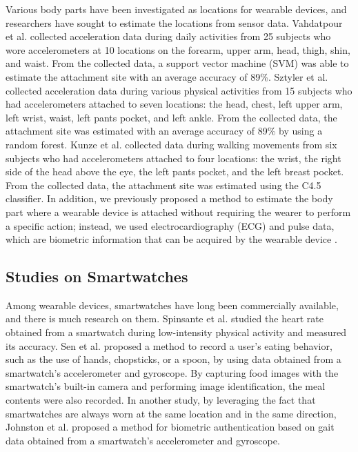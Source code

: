 \documentclass[sigchi,authordraft]{acmart}
\begin{document}
Various body parts have been investigated as locations for wearable devices, and researchers have sought to estimate the locations from sensor data. Vahdatpour et al. \cite{localization_vahdatpour} collected acceleration data during daily activities from 25 subjects who wore accelerometers at 10 locations on the forearm, upper arm, head, thigh, shin, and waist. From the collected data, a support vector machine (SVM) was able to estimate the attachment site with an average accuracy of 89\%. Sztyler et al. \cite{localization_sztyler} collected acceleration data during various physical activities from 15 subjects who had accelerometers attached to seven locations: the head, chest, left upper arm, left wrist, waist, left pants pocket, and left ankle. From the collected data, the attachment site was estimated with an average accuracy of 89\% by using a random forest. Kunze et al. \cite{localization_kunze} collected data during walking movements from six subjects who had accelerometers attached to four locations: the wrist, the right side of the head above the eye, the left pants pocket, and the left breast pocket. From the collected data, the attachment site was estimated using the C4.5 classifier. In addition, we previously proposed a method to estimate the body part where a wearable device is attached without requiring the wearer to perform a specific action; instead, we used electrocardiography (ECG) and pulse data, which are biometric information that can be acquired by the wearable device \cite{localization_yoshida}.


\subsection{Studies on Smartwatches}
Among wearable devices, smartwatches have long been commercially available, and there is much research on them. Spinsante et al. \cite{accuracy_in_low_intensity} studied the heart rate obtained from a smartwatch during low-intensity physical activity and measured its accuracy. Sen et al. \cite{eating_recognition} proposed a method to record a user's eating behavior, such as the use of hands, chopsticks, or a spoon, by using data obtained from a smartwatch's accelerometer and gyroscope. By capturing food images with the smartwatch's built-in camera and performing image identification, the meal contents were also recorded. In another study, by leveraging the fact that smartwatches are always worn at the same location and in the same direction, Johnston et al. \cite{smartwatch_walk_authentication} proposed a method for biometric authentication based on gait data obtained from a smartwatch's accelerometer and gyroscope.\par
\end{document}
